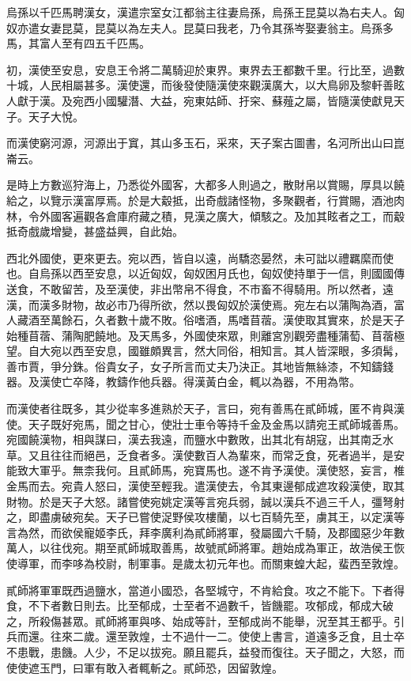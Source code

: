 烏孫以千匹馬聘漢女，漢遣宗室女江都翁主往妻烏孫，烏孫王昆莫以為右夫人。匈奴亦遣女妻昆莫，昆莫以為左夫人。昆莫曰我老，乃令其孫岑娶妻翁主。烏孫多馬，其富人至有四五千匹馬。

初，漢使至安息，安息王令將二萬騎迎於東界。東界去王都數千里。行比至，過數十城，人民相屬甚多。漢使還，而後發使隨漢使來觀漢廣大，以大鳥卵及黎軒善眩人獻于漢。及宛西小國驩潛、大益，宛東姑師、扜穼、蘇薤之屬，皆隨漢使獻見天子。天子大悅。

而漢使窮河源，河源出于窴，其山多玉石，采來，天子案古圖書，名河所出山曰崑崙云。

是時上方數巡狩海上，乃悉從外國客，大都多人則過之，散財帛以賞賜，厚具以饒給之，以覽示漢富厚焉。於是大觳抵，出奇戲諸怪物，多聚觀者，行賞賜，酒池肉林，令外國客遍觀各倉庫府藏之積，見漢之廣大，傾駭之。及加其眩者之工，而觳抵奇戲歲增變，甚盛益興，自此始。

西北外國使，更來更去。宛以西，皆自以遠，尚驕恣晏然，未可詘以禮羈縻而使也。自烏孫以西至安息，以近匈奴，匈奴困月氏也，匈奴使持單于一信，則國國傳送食，不敢留苦，及至漢使，非出幣帛不得食，不市畜不得騎用。所以然者，遠漢，而漢多財物，故必市乃得所欲，然以畏匈奴於漢使焉。宛左右以蒲陶為酒，富人藏酒至萬餘石，久者數十歲不敗。俗嗜酒，馬嗜苜蓿。漢使取其實來，於是天子始種苜蓿、蒲陶肥饒地。及天馬多，外國使來眾，則離宮別觀旁盡種蒲萄、苜蓿極望。自大宛以西至安息，國雖頗異言，然大同俗，相知言。其人皆深眼，多須髯，善市賈，爭分銖。俗貴女子，女子所言而丈夫乃決正。其地皆無絲漆，不知鑄錢器。及漢使亡卒降，教鑄作他兵器。得漢黃白金，輒以為器，不用為幣。

而漢使者往既多，其少從率多進熟於天子，言曰，宛有善馬在貳師城，匿不肯與漢使。天子既好宛馬，聞之甘心，使壯士車令等持千金及金馬以請宛王貳師城善馬。宛國饒漢物，相與謀曰，漢去我遠，而鹽水中數敗，出其北有胡寇，出其南乏水草。又且往往而絕邑，乏食者多。漢使數百人為輩來，而常乏食，死者過半，是安能致大軍乎。無柰我何。且貳師馬，宛寶馬也。遂不肯予漢使。漢使怒，妄言，椎金馬而去。宛貴人怒曰，漢使至輕我。遣漢使去，令其東邊郁成遮攻殺漢使，取其財物。於是天子大怒。諸嘗使宛姚定漢等言宛兵弱，誠以漢兵不過三千人，彊弩射之，即盡虜破宛矣。天子已嘗使浞野侯攻樓蘭，以七百騎先至，虜其王，以定漢等言為然，而欲侯寵姬李氏，拜李廣利為貳師將軍，發屬國六千騎，及郡國惡少年數萬人，以往伐宛。期至貳師城取善馬，故號貳師將軍。趙始成為軍正，故浩侯王恢使導軍，而李哆為校尉，制軍事。是歲太初元年也。而關東蝗大起，蜚西至敦煌。

貳師將軍軍既西過鹽水，當道小國恐，各堅城守，不肯給食。攻之不能下。下者得食，不下者數日則去。比至郁成，士至者不過數千，皆饑罷。攻郁成，郁成大破之，所殺傷甚眾。貳師將軍與哆、始成等計，至郁成尚不能舉，況至其王都乎。引兵而還。往來二歲。還至敦煌，士不過什一二。使使上書言，道遠多乏食，且士卒不患戰，患饑。人少，不足以拔宛。願且罷兵，益發而復往。天子聞之，大怒，而使使遮玉門，曰軍有敢入者輒斬之。貳師恐，因留敦煌。

